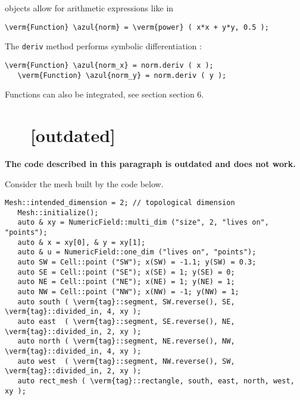 {\small\tt {}} objects allow for arithmetic expressions like in

\begin{Verbatim}[commandchars=\\\{\},formatcom=\small\tt,
   baselinestretch=0.94,framesep=2mm                     ]
   \verm{Function} \azul{norm} = \verm{power} ( x*x + y*y, 0.5 );
\end{Verbatim}

The {\small\tt deriv} method performs symbolic differentiation :

\begin{Verbatim}[commandchars=\\\{\},formatcom=\small\tt,
   baselinestretch=0.94,framesep=2mm                     ]
   \verm{Function} \azul{norm_x} = norm.deriv ( x );
   \verm{Function} \azul{norm_y} = norm.deriv ( y );
\end{Verbatim}

Functions can also be integrated, see section \numb section 6.


\section{~~ [outdated]}\label{\numb section 5.\numb parag 2}

{\normalfont\bfseries The code described in this paragraph is outdated and does not work.}

Consider the mesh built by the code below.

\begin{Verbatim}[commandchars=\\\{\},formatcom=\small\tt,
   baselinestretch=0.94,framesep=2mm                     ]
   Mesh::intended_dimension = 2; // topological dimension
   Mesh::initialize();
   auto & xy = NumericField::multi_dim ("size", 2, "lives on", "points");	
   auto & x = xy[0], & y = xy[1];
   auto & u = NumericField::one_dim ("lives on", "points");
   auto SW = Cell::point ("SW"); x(SW) = -1.1; y(SW) = 0.3;
   auto SE = Cell::point ("SE"); x(SE) = 1; y(SE) = 0;
   auto NE = Cell::point ("NE"); x(NE) = 1; y(NE) = 1;
   auto NW = Cell::point ("NW"); x(NW) = -1; y(NW) = 1;
   auto south ( \verm{tag}::segment, SW.reverse(), SE, \verm{tag}::divided_in, 4, xy );
   auto east  ( \verm{tag}::segment, SE.reverse(), NE, \verm{tag}::divided_in, 2, xy );
   auto north ( \verm{tag}::segment, NE.reverse(), NW, \verm{tag}::divided_in, 4, xy );
   auto west  ( \verm{tag}::segment, NW.reverse(), SW, \verm{tag}::divided_in, 2, xy );
   auto rect_mesh ( \verm{tag}::rectangle, south, east, north, west, xy );
\end{Verbatim}

